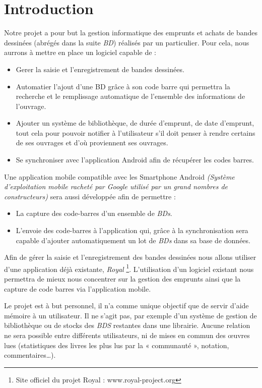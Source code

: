 \part*{Introduction}
Notre projet a pour but la gestion informatique des emprunts et achats de bandes dessinées (abrégés dans la suite \emph{BD}) réalisés par un particulier.
Pour cela, nous aurrons à mettre en place un logiciel capable de : 
\begin{itemize}
\item Gerer la saisie et l'enregistrement de bandes dessinées.
\item Automatier l'ajout d'une BD grâce à son code barre qui permettra la recherche et le remplissage automatique de l'ensemble des informations de l'ouvrage.
\item Ajouter un système de bibliothèque, de durée d'emprunt, de date d'emprunt, tout cela pour pouvoir notifier à l'utilisateur s'il doit penser à rendre certains de ses ouvrages et d'où proviennent ses ouvrages.
\item Se synchroniser avec l'application Android afin de récupérer les codes barres.
\end{itemize}

Une application mobile compatible avec les Smartphone Android \textit{(Système d'exploitation mobile racheté par Google utilisé par un grand nombres de constructeurs)} sera aussi développée afin de permettre :
\begin{itemize}
\item La capture des code-barres d'un ensemble de \emph{BDs}.
\item L'envoie des code-barres à l'application qui, grâce à la synchronisation sera capable d'ajouter automatiquement un lot de \emph{BDs} dans sa base de données.
\end{itemize}

Afin de gérer la saisie et l'enregistrement des bandes dessinées nous allons utiliser d'une application déjà existante, 
\emph{Royal} \footnote{Site officiel du projet Royal : www.royal-project.org}. 
L'utilisation d'un logiciel existant nous permettra de mieux nous concentrer sur la gestion des emprunts ainsi que la capture de code barres via l'application mobile.

Le projet est à but personnel, il n'a comme unique objectif que de servir d'aide mémoire à un utilisateur.
Il ne s'agit pas, par exemple d'un système de gestion de bibliothèque ou de stocks des \emph{BDS} restantes dans une librairie.
Aucune relation ne sera possible entre différents utilisateurs, ni de mises en commun des œuvres lues
(statistiques des livres les plus lus par la « communauté », notation, commentaires…).
